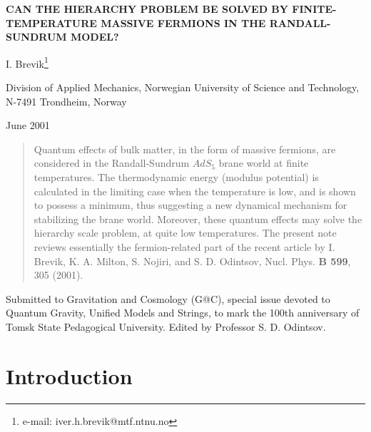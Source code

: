 \documentclass[a4paper,12pt]{article}
\begin{document}
\begin{center}


\textbf{CAN THE HIERARCHY PROBLEM BE SOLVED BY 
FINITE-TEMPERATURE  MASSIVE FERMIONS IN THE RANDALL-SUNDRUM MODEL?}

\bigskip

\bigskip

   I. Brevik\footnote{e-mail: iver.h.brevik@mtf.ntnu.no}  \\        

  \bigskip

\bigskip            

          Division of Applied Mechanics,
           Norwegian University of Science and Technology,
           N-7491 Trondheim, Norway \\           
\bigskip
\bigskip

 June 2001
\end{center} 

\bigskip        

\begin{abstract}

    Quantum effects of bulk matter, in the form of massive fermions, are considered in the Randall-Sundrum $AdS_5$ brane world at finite temperatures. The thermodynamic energy (modulus potential) is calculated in the limiting case when the temperature is low, and is shown to possess a minimum, thus suggesting a new dynamical mechanism for stabilizing the brane world. Moreover, these quantum effects may solve the hierarchy scale problem, at quite low temperatures. The present note reviews essentially the fermion-related part of the recent article by I. Brevik, K. A. Milton, S. Nojiri, and S. D. Odintsov, Nucl. Phys. {\bf B 599}, 305 (2001).
\end{abstract}


\bigskip
\bigskip
\bigskip
\bigskip

Submitted to Gravitation and Cosmology (G@C), special issue devoted to Quantum Gravity, Unified Models and Strings, to mark the 100th anniversary of Tomsk State Pedagogical University. Edited by Professor S. D. Odintsov.

         

\newpage
 

\section{Introduction}
\end{document}
